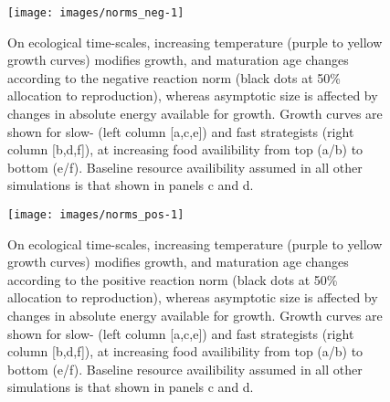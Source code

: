 \documentclass[11pt]{article}\usepackage[]{graphicx}\usepackage[]{color}
\makeatletter
\def\maxwidth{ %
  \ifdim\Gin@nat@width>\linewidth
    \linewidth
  \else
    \Gin@nat@width
  \fi
}
\makeatother
\begin{document}
\begin{figure}

{\centering \texttt{[image: images/norms\_neg-1]} 

}

\caption[On ecological time-scales, increasing temperature (purple to yellow growth curves) modifies growth, and maturation age changes according to the negative reaction norm (black dots at 50\% allocation to reproduction), whereas asymptotic size is affected by changes in absolute energy available for growth]{On ecological time-scales, increasing temperature (purple to yellow growth curves) modifies growth, and maturation age changes according to the negative reaction norm (black dots at 50\% allocation to reproduction), whereas asymptotic size is affected by changes in absolute energy available for growth. Growth curves are shown for slow- (left column [a,c,e]) and fast strategists (right column [b,d,f]), at increasing food availibility from top (a/b) to bottom (e/f). Baseline resource availibility assumed in all other simulations is that shown in panels c and d.}\label{fig:norms_neg}
\end{figure}






\begin{figure}

{\centering \texttt{[image: images/norms\_pos-1]} 

}

\caption[On ecological time-scales, increasing temperature (purple to yellow growth curves) modifies growth, and maturation age changes according to the positive reaction norm (black dots at 50\% allocation to reproduction), whereas asymptotic size is affected by changes in absolute energy available for growth]{On ecological time-scales, increasing temperature (purple to yellow growth curves) modifies growth, and maturation age changes according to the positive reaction norm (black dots at 50\% allocation to reproduction), whereas asymptotic size is affected by changes in absolute energy available for growth. Growth curves are shown for slow- (left column [a,c,e]) and fast strategists (right column [b,d,f]), at increasing food availibility from top (a/b) to bottom (e/f). Baseline resource availibility assumed in all other simulations is that shown in panels c and d.}\label{fig:norms_pos}
\end{figure}
\end{document}
